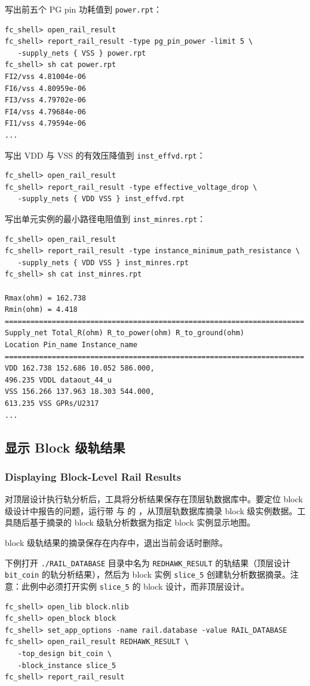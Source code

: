 写出前五个 PG pin 功耗值到 \texttt{power.rpt}：
\begin{lstlisting}
fc_shell> open_rail_result
fc_shell> report_rail_result -type pg_pin_power -limit 5 \
   -supply_nets { VSS } power.rpt
fc_shell> sh cat power.rpt
FI2/vss 4.81004e-06
FI6/vss 4.80959e-06
FI3/vss 4.79702e-06
FI4/vss 4.79684e-06
FI1/vss 4.79594e-06
...
\end{lstlisting}

写出 VDD 与 VSS 的有效压降值到 \texttt{inst\_effvd.rpt}：
\begin{lstlisting}
fc_shell> open_rail_result
fc_shell> report_rail_result -type effective_voltage_drop \
   -supply_nets { VDD VSS } inst_effvd.rpt
\end{lstlisting}

写出单元实例的最小路径电阻值到 \texttt{inst\_minres.rpt}：
\begin{lstlisting}
fc_shell> open_rail_result
fc_shell> report_rail_result -type instance_minimum_path_resistance \
   -supply_nets { VDD VSS } inst_minres.rpt
fc_shell> sh cat inst_minres.rpt

Rmax(ohm) = 162.738
Rmin(ohm) = 4.418
======================================================================
Supply_net Total_R(ohm) R_to_power(ohm) R_to_ground(ohm)
Location Pin_name Instance_name
======================================================================
VDD 162.738 152.686 10.052 586.000,
496.235 VDDL dataout_44_u
VSS 156.266 137.963 18.303 544.000,
613.235 VSS GPRs/U2317
...
\end{lstlisting}

\subsection{显示 Block 级轨结果}
\subsubsection*{Displaying Block-Level Rail Results}

对顶层设计执行轨分析后，工具将分析结果保存在顶层轨数据库中。要定位 block 级设计中报告的问题，运行带  与  的 ，从顶层轨数据库摘录 block 级实例数据。工具随后基于摘录的 block 级轨分析数据为指定 block 实例显示地图。

\begin{noteBox}
block 级轨结果的摘录保存在内存中，退出当前会话时删除。
\end{noteBox}

下例打开 \texttt{./RAIL\_DATABASE} 目录中名为 \texttt{REDHAWK\_RESULT} 的轨结果（顶层设计 \texttt{bit\_coin} 的轨分析结果），然后为 block 实例 \texttt{slice\_5} 创建轨分析数据摘录。注意：此例中必须打开实例 \texttt{slice\_5} 的 block 设计，而非顶层设计。
\begin{lstlisting}
fc_shell> open_lib block.nlib
fc_shell> open_block block
fc_shell> set_app_options -name rail.database -value RAIL_DATABASE
fc_shell> open_rail_result REDHAWK_RESULT \
   -top_design bit_coin \
   -block_instance slice_5
fc_shell> report_rail_result
\end{lstlisting}

